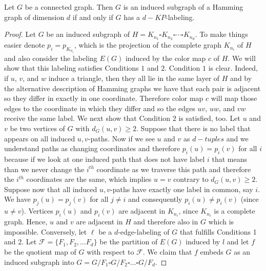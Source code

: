\documentclass[12pt,a4paper,titlepage,openany]{report}
\begin{document}
\begin{theorem}\label{thm:mainkp}
Let $G$ be a connected graph. Then $G$ is an induced subgraph of a Hamming graph of dimension $d$ if and only if $G$ has a $d-KP$-labeling.
\end{theorem}
\begin{proof}
Let $G$ be an induced subgraph of $H=K_{n_1}\square K_{n_2}\square\cdots\square K_{n_d}$. To make things easier denote $p_i=p_{K_{n_i}}$, which is the projection of the complete graph $K_{n_i}$ of $H$ and also consider the labeling $E(G)$ induced by the color map $c$ of $H$. We will show that this labeling satisfies Conditions $1$ and $2$.\newline
Condition $1$ is clear. Indeed, if $u$, $v$, and $w$ induce a triangle, then they all lie in
the same layer of $H$ and by the alternative description of Hamming graphs we have that each pair is adjacent so they differ in exactly in one coordinate. Therefore color map $c$ will map those edges to the coordinate in which they differ and so the edges $uv$, $uw$, and $vw$ receive the same label.\newline
We next show that Condition $2$ is satisfied, too. Let $u$ and $v$ be two vertices of $G$ with $d_G(u,v)\geq 2$.
Suppose that there is no label that appears on all induced $u, v$-paths. Now if we see $u$ and $v$ as $d-tuples$ and we understand paths as changing coordinates and therefore $p_i(u)=p_i(v)$ for all $i$ because if we look at one induced path that does not have label $i$ that means than we never change the $i^{th}$ coordinate as we traverse this path and therefore the $i^{th}$ coordinates are the same, which implies $u=v$ contrary to $d_G(u,v)\geq 2$. Suppose now that all induced $u, v$-paths have exactly one label in common, say $i$. We have $p_j(u)=p_j(v)$ for all $j\neq i$ and consequently $p_i(u)\neq p_i(v)$ (since $u\neq v$). Vertices $p_i(u)$ and $p_i(v)$ are adjacent in $K_{n_i}$, since $K_{n_i}$ is a complete graph. Hence, $u$ and $v$ are adjacent in $H$ and therefore also in $G$ which is impossible.\newline
Conversely, let $\ell$ be a $d$-edge-labeling of $G$ that fulfills Conditions 1 and 2. Let $\mathcal{F}=\{F_1,F_2,\ldots F_d\}$ be the partition of $E(G)$ induced by $l$ and let $f$ be the quotient map of $G$ with respect to $\mathcal{F}$. We claim that $f$ embeds $G$ as an induced subgraph into $G=G/ F_1\square G/ F_2\square \ldots \square G/ F_d$.\newline

\end{proof}
\end{document}
